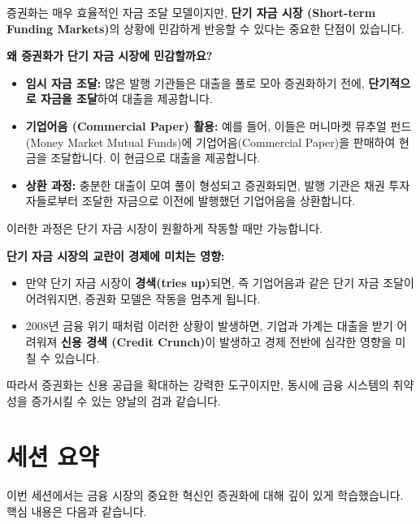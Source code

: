 \documentclass[11pt,a4paper]{article}
\begin{document}
증권화는 매우 효율적인 자금 조달 모델이지만, \textbf{단기 자금 시장 (Short-term Funding Markets)}의 상황에 민감하게 반응할 수 있다는 중요한 단점이 있습니다.

\begin{tcolorbox}[colback=myred!10!white, colframe=myred!75!black, title=\textbf{단기 자금 시장과 증권화의 연결고리}]
  \textbf{왜 증권화가 단기 자금 시장에 민감할까요?}
  \begin{itemize}
    \item \textbf{임시 자금 조달:} 많은 발행 기관들은 대출을 풀로 모아 증권화하기 전에, \textbf{단기적으로 자금을 조달}하여 대출을 제공합니다.
    \item \textbf{기업어음 (Commercial Paper) 활용:} 예를 들어, 이들은 머니마켓 뮤추얼 펀드(Money Market Mutual Funds)에 기업어음(Commercial Paper)을 판매하여 현금을 조달합니다. 이 현금으로 대출을 제공합니다.
    \item \textbf{상환 과정:} 충분한 대출이 모여 풀이 형성되고 증권화되면, 발행 기관은 채권 투자자들로부터 조달한 자금으로 이전에 발행했던 기업어음을 상환합니다.
  \end{itemize}
  이러한 과정은 단기 자금 시장이 원활하게 작동할 때만 가능합니다.

  \textbf{단기 자금 시장의 교란이 경제에 미치는 영향:}
  \begin{itemize}
    \item 만약 단기 자금 시장이 \textbf{경색(tries up)}되면, 즉 기업어음과 같은 단기 자금 조달이 어려워지면, 증권화 모델은 작동을 멈추게 됩니다.
    \item 2008년 금융 위기 때처럼 이러한 상황이 발생하면, 기업과 가계는 대출을 받기 어려워져 \textbf{신용 경색 (Credit Crunch)}이 발생하고 경제 전반에 심각한 영향을 미칠 수 있습니다.
  \end{itemize}
  따라서 증권화는 신용 공급을 확대하는 강력한 도구이지만, 동시에 금융 시스템의 취약성을 증가시킬 수 있는 양날의 검과 같습니다.
\end{tcolorbox}

\newpage
\section*{세션 요약}

이번 세션에서는 금융 시장의 중요한 혁신인 증권화에 대해 깊이 있게 학습했습니다. 핵심 내용은 다음과 같습니다.
\end{document}
